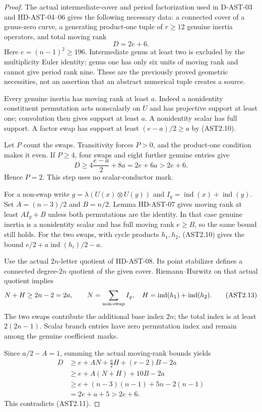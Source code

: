 \begin{proof}
The actual intermediate-cover and period factorization used in
D-AST-03 and HD-AST-04--06 gives the following necessary data:
a connected cover of a genus-zero curve, a generating product-one
tuple of $r\ge12$ genuine inertia operators, and total moving rank
\[
                         D=2e+6.                          \tag{AST2.11}
\]
Here $e=(n-1)^2\ge196$. Intermediate genus at least two is
excluded by the multiplicity Euler identity; genus one has only
six units of moving rank and cannot give period rank nine.
These are the previously proved geometric necessities, not an
assertion that an abstract numerical tuple creates a source.

Every genuine inertia has moving rank at least $a$. Indeed a
nonidentity constituent permutation acts nonscalarly on $U$ and
has projective support at least one; convolution then gives support
at least $a$. A nonidentity scalar has full support. A factor swap
has support at least $(e-a)/2\ge a$ by (AST2.10).

Let $P$ count the swaps. Transitivity forces $P>0$, and the
product-one condition makes it even. If $P\ge4$, four swaps
and eight further genuine entries give
\[
              D\ge4\frac{e-a}{2}+8a=2e+6a>2e+6.
                                                               \tag{AST2.12}
\]
Hence $P=2$. This step uses no scalar-conductor mark.

For a non-swap write $g=\lambda(U(x)\otimes U(y))$ and
$I_g=\operatorname{ind}(x)+\operatorname{ind}(y)$.
Set $A=(n-3)/2$ and $B=n/2$.
Lemma HD-AST-07 gives moving rank at least $AI_g+B$ unless
both permutations are the identity. In that case genuine inertia
is a nonidentity scalar and has full moving rank $e\ge B$, so
the same bound still holds.
For the two swaps, with cycle products $h_1,h_2$, (AST2.10)
gives the bound $e/2+a\operatorname{ind}(h_i)/2-a$.

Use the actual $2n$-letter quotient of HD-AST-08. Its point
stabilizer defines a connected degree-$2n$ quotient of the given
cover. Riemann--Hurwitz on that actual quotient implies
\[
 N+H\ge2n-2=2a,\qquad
 N=\sum_{\rm non\text{-}swap} I_g,\quad
 H=\operatorname{ind}(h_1)+\operatorname{ind}(h_2).
                                                               \tag{AST2.13}
\]
The two swaps contribute the additional base index $2n$;
the total index is at least $2(2n-1)$. Scalar branch entries
have zero permutation index and remain among the genuine
coefficient marks.

Since $a/2-A=1$, summing the actual moving-rank bounds yields
\[
 \begin{split}
 D&\ge e+AN+\frac a2H+(r-2)B-2a\\
  &\ge e+A(N+H)+10B-2a\\
  &\ge e+(n-3)(n-1)+5n-2(n-1)\\
  &=2e+a+5>2e+6.
 \end{split}                                             \tag{AST2.14}
\]
This contradicts (AST2.11).
\end{proof}

